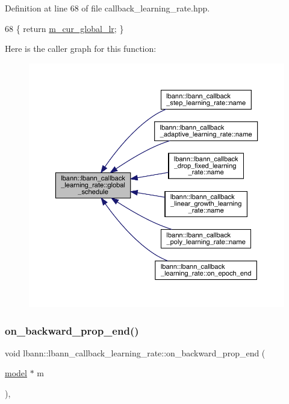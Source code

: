 Definition at line 68 of file callback\+\_\+learning\+\_\+rate.\+hpp.


\begin{DoxyCode}
68 \{ \textcolor{keywordflow}{return} \hyperlink{classlbann_1_1lbann__callback__learning__rate_a97194f282c29a748c915d9811a8a99fb}{m\_cur\_global\_lr}; \}
\end{DoxyCode}
Here is the caller graph for this function\+:\nopagebreak
\begin{figure}[H]
\begin{center}
\leavevmode
\includegraphics[width=350pt]{classlbann_1_1lbann__callback__learning__rate_a7869b93e5963d6f76da68d8c8137b979_icgraph}
\end{center}
\end{figure}
\mbox{\label{classlbann_1_1lbann__callback__learning__rate_ab6aa0530604e32a1be2b37f3933f6bf6}} 
\subsubsection{\texorpdfstring{on\+\_\+backward\+\_\+prop\+\_\+end()}{on\_backward\_prop\_end()}}
{\footnotesize\ttfamily void lbann\+::lbann\+\_\+callback\+\_\+learning\+\_\+rate\+::on\+\_\+backward\+\_\+prop\+\_\+end (\begin{DoxyParamCaption}\item[{\hyperlink{classlbann_1_1model}{model} $\ast$}]{m }\end{DoxyParamCaption})\hspace{0.3cm}{\ttfamily [override]}, {\ttfamily [virtual]}}

